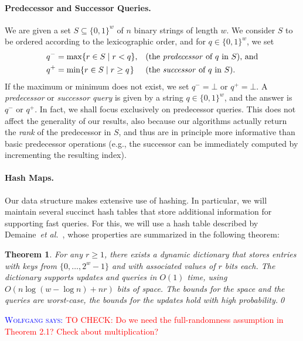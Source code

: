 \documentclass[a4paper,11pt]{article}
\newtheorem{theorem}{Theorem}[section]
\newcommand{\etal}{\emph{et al.}\xspace}
\newcommand{\?}{\mskip1.5mu}
\newcommand{\aremark}[3]{\textcolor{blue}{\textsc{#1 #2:}}
  \textcolor{red}{\textsf{#3}}}
\newcommand{\wolfgang}[2][says]{\aremark{Wolfgang}{#1}{#2}}
\begin{document}
\paragraph{Predecessor and Successor Queries.}
We are given a set $S \subseteq \{0, 1\}^w$ of $n$ binary strings of 
length $w$. We consider $S$ to be ordered according to the 
lexicographic order, and for $q \in \{0, 1\}^w$, we set
\begin{align*}
     q^- &= \max \{r \in S \mid r < q\},  && 
        \text{(the \emph{predecessor} of $q$ in $S$), and} \\
     q^+ &= \min \{r \in S \mid r \geq q\?\} && 
       \text{(the \emph{successor} of $q$ in $S$)}.
\end{align*}
If the maximum or minimum does not exist, we set $q^- = \bot$ or 
$q^+ = \bot$.  A \emph{predecessor} or \emph{successor query} is
given by a string $q \in \{0, 1\}^w$, and the answer is $q^-$ or 
$q^+$. In fact, we shall focus exclusively on predecessor queries. 
This does not affect the generality of our results,
also because our algorithms actually return the \emph{rank} of the 
predecessor in $S$, and thus are in principle more informative 
than basic predecessor operations
(e.g., the successor can be immediately computed by incrementing 
the resulting index).

\paragraph{Hash Maps.}
Our data structure makes extensive use of
hashing. In particular, we will maintain several
succinct hash tables that store additional
information for supporting fast queries.
For this, we will use a hash table described
by Demaine~\etal~\cite{DemaineMePaPa06}, whose
properties are summarized in the following theorem:

\begin{theorem}\label{thm:succinct_retrieval_only_hashtable}
For any $r \geq 1$, there exists a dynamic dictionary that
stores entries with keys from $\{0, \dots, 2^w-1\}$ and with 
associated values of $r$ bits each.
The dictionary supports updates and queries in $O(1)$ time,
using $O(n \log(w - \log n) + nr)$ \emph{bits} of space.
The bounds for the space and the queries are
worst-case, the bounds for the updates hold with
high probability.\qed
\end{theorem}

\wolfgang{TO CHECK: Do we need the full-randomness assumption in 
Theorem 2.1? Check about multiplication?}
\end{document}
